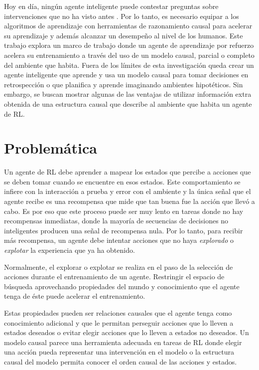 Hoy en día, ningún agente inteligente puede contestar 
preguntas sobre intervenciones que no ha visto antes 
\cite{pearl2018theoretical}. Por lo tanto, es necesario equipar a
los algoritmos de aprendizaje con herramientas de razonamiento
causal para acelerar su aprendizaje y además alcanzar 
un desempeño al nivel de los humanos.
Este trabajo explora un marco de trabajo donde un agente
de aprendizaje por refuerzo acelera su entrenamiento a través
del uso de un modelo causal, parcial o completo del ambiente
que habita. Fuera de los límites de
esta investigación queda
crear un agente inteligente que aprende y usa un modelo causal para tomar decisiones en retrospección o que
planifica y aprende imaginando ambientes hipotéticos.
Sin embargo, se buscan mostrar algunas de las ventajas de utilizar información extra obtenida de una estructura causal que 
describe al ambiente que habita un agente de RL.


\section{Problemática}

Un agente de RL debe aprender a mapear los estados
que percibe a acciones que se deben tomar cuando
se encuentre en esos estados. Este comportamiento
se infiere con la interacción a prueba y error con el ambiente y la única señal que el agente recibe es una recompensa que mide que tan buena fue la acción que llevó a cabo. Es por eso que este proceso puede ser muy lento en tareas donde no hay recompensas inmediatas, donde la mayoría de secuencias
de decisiones no inteligentes producen una señal de recompensa nula.
Por lo tanto, para recibir más recompensa, un agente debe intentar acciones que no haya \textit{explorado} o \textit{explotar} la experiencia que ya ha obtenido.

Normalmente, el explorar o explotar se realiza en el 
paso de la selección de acciones durante el entrenamiento de un agente. Restringir el espacio de búsqueda aprovechando 
propiedades del mundo y conocimiento que el agente tenga
de éste puede acelerar el entrenamiento.

Estas propiedades pueden ser relaciones causales 
que el agente tenga como conocimiento adicional
y que le permitan perseguir acciones que lo lleven a
estados deseados o evitar elegir acciones que lo lleven a 
estados no deseados. Un modelo causal parece una herramienta adecuada en
tareas de RL donde elegir una acción pueda representar una intervención en el modelo o la estructura causal del modelo permita conocer el orden causal de las acciones y estados.

